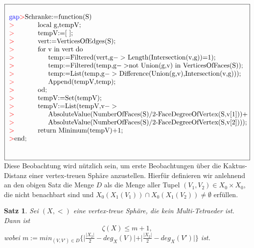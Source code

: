 \documentclass[12pt,titlepage,twoside,cleardoublepage]{article}
\theoremstyle{nummermitklammern}
\newtheorem{satz}[temp]{Satz}
\newtheorem{satz}[zahl]{Satz}
\numberwithin{equation}{section}
\begin{document}
$\fbox{
\parbox{13.4cm}{
\begin{tabbing}
\textcolor{blue}{gap}\textcolor{red}{$>$}Schr\=anke:=function(S)\\
\textcolor{red}{$>$}\> local g,tempV;\\
\textcolor{red}{$>$}\> tempV:=[ ];\\
\textcolor{red}{$>$}\> vert:=VerticesOfEdges(S);\\
\textcolor{red}{$>$}\> for \=v in vert do\\
\textcolor{red}{$>$}\>\> temp:=Filtered(vert,g$->$ Length(Intersection(v,g))=1);\\
\textcolor{red}{$>$}\>\> temp:=Filtered(temp,g$->$not Union(g,v) in VerticesOfFaces(S));\\
\textcolor{red}{$>$}\>\> temp:=List(temp,g$->$ Difference(Union(g,v),Intersection(v,g)));\\
\textcolor{red}{$>$}\>\> Append(tempV,temp);\\
\textcolor{red}{$>$}\> od;\\
\textcolor{red}{$>$}\> tempV:=Set(tempV);\\
\textcolor{red}{$>$}\> tempV:=List(tempV,v$->$\\ \textcolor{red}{$>$}\>\>AbsoluteValue(NumberOfFaces(S)/2-FaceDegreeOfVertex(S,v[1]))+\\
\textcolor{red}{$>$}\>\> AbsoluteValue(NumberOfFaces(S)/2-FaceDegreeOfVertex(S,v[2])));\\
\textcolor{red}{$>$}\> return Minimum(tempV)+1;\\
\textcolor{red}{$>$}end;\\
\end{tabbing}
}}$\\
Diese Beobachtung wird nützlich sein, um erste Beobachtungen über die Kaktus-Distanz einer vertex-treuen Sphäre anzustellen. Hierfür definieren wir anlehnend an den obigen Satz die Menge $D$ als die Menge aller Tupel $(V_1,V_2)\in X_0 \times X_0$, die nicht benachbart sind und $ X_0(X_1(V_1))\cap X_0(X_1(V_2))\neq \emptyset$ erfüllen.
\begin{satz}
Sei $(X,<)$ eine vertex-treue Sphäre, die kein Multi-Tetraeder ist. Dann ist 
\[
\zeta(X)\leq m+1,
\] wobei $m:=min_{(V,V')\in D}\{\vert\frac{\vert X_2 \vert}{2}-deg_X(V)\vert +\vert \frac{\vert X_2 \vert}{2}-deg_X(V')\vert\}$
 ist.
\end{satz}
\end{document}
